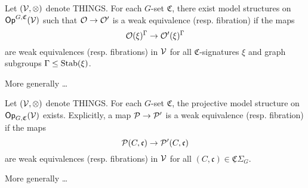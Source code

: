 \documentclass[a4paper,10pt
]{article}%
\newcommand{\UC}{\underline{\mathfrak C}}
\renewcommand{\1}{\ensuremath{\mathbb{id}}}
\begin{document}

\begin{theorem}
      \label{THM1_C}
      Let $(\V,\otimes)$ denote {\color{red} THINGS}.
      For each $G$-set $\mathfrak C$,
      there exist model structures on $\Op^{G, \mathfrak C}(\V)$ such that
      $\O \to \O'$ is a weak equivalence (resp. fibration) if the maps
      \begin{equation}
            \O(\xi)^\Gamma \to \O'(\xi)^\Gamma
      \end{equation}
      are weak equivalences (resp. fibrations) in $\V$ for all
      $\mathfrak C$-signatures $\xi$ and
      graph subgroups $\Gamma \leq \Stab(\xi)$.

      {\color{red} More generally \ldots}
\end{theorem}


\begin{theorem}
      \label{THM2_C}
      Let $(\V,\otimes)$ denote {\color{red} THINGS}.
      For each $G$-set $\mathfrak C$,
      the projective model structure on $\Op_{G, \mathfrak C}(\V)$ exists.
      Explicitly, a map
      $\P \to \P'$ is a weak equivalence (resp. fibration) if the maps
      \begin{equation}
            \P(C,\mathfrak c) \to \P'(C, \mathfrak c)
      \end{equation}
      are weak equivalences (resp. fibrations) in $\V$ for all
      $(C,\mathfrak c) \in \UC\Sigma_G$.

      {\color{red} More generally \ldots}
\end{theorem}
\end{document}
